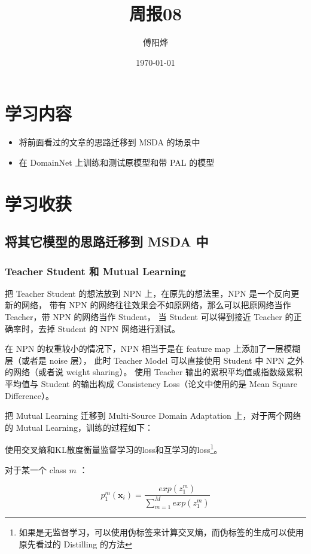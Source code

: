 \documentclass[UTF8]{ctexart}
\title{周报08}
\author{傅阳烨}
\date{\today}
\begin{document}
    \maketitle
    \section{学习内容}
        \begin{itemize}
            \item 将前面看过的文章的思路迁移到 MSDA 的场景中
            \item 在 DomainNet 上训练和测试原模型和带 PAL 的模型
        \end{itemize}
    \section{学习收获}
        \subsection{将其它模型的思路迁移到 MSDA 中}
            \subsubsection{Teacher Student 和 Mutual Learning}
                把 Teacher Student 的想法放到 NPN 上，在原先的想法里，NPN 是一个反向更新的网络，
                带有 NPN 的网络往往效果会不如原网络，那么可以把原网络当作 Teacher，带 NPN 的网络当作 Student，
                当 Student 可以得到接近 Teacher 的正确率时，去掉 Student 的 NPN 网络进行测试。

                在 NPN 的权重较小的情况下，NPN 相当于是在 feature map 上添加了一层模糊层（或者是 noise 层），
                此时 Teacher Model 可以直接使用 Student 中 NPN 之外的网络（或者说 weight sharing）。
                使用 Teacher 输出的累积平均值或指数级累积平均值与 Student 的输出构成 Consistency Loss（论文中使用的是 Mean Square Difference）。

                把 Mutual Learning 迁移到 Multi-Source Domain Adaptation 上，对于两个网络的 Mutual Learning，训练的过程如下：

                使用交叉熵和KL散度衡量监督学习的loss和互学习的loss\footnote{如果是无监督学习，可以使用伪标签来计算交叉熵，而伪标签的生成可以使用原先看过的 Distilling 的方法}。

                对于某一个 class $m$ ：

                $$
                    p_{1}^{m}(\boldsymbol{x}_i) = \frac{exp(z_{1}^{m})}{\sum_{m=1}^{M} exp(z_{1}^{m})}
                $$
\end{document}
